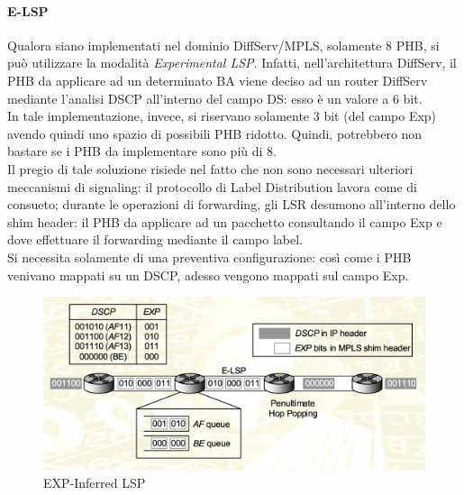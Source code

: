 \documentclass{article}
\begin{document}
\paragraph{E-LSP} Qualora siano implementati nel dominio DiffServ/MPLS, solamente 8 PHB, si può utilizzare la modalità \textit{Experimental LSP}. Infatti, nell'architettura DiffServ, il PHB da applicare ad un determinato BA viene deciso ad un router DiffServ mediante l'analisi DSCP all'interno del campo DS: esso è un valore a 6 bit. \\ In tale implementazione, invece, si riservano solamente 3 bit (del campo Exp) avendo quindi uno spazio di possibili PHB ridotto. Quindi, potrebbero non bastare se i PHB da implementare sono più di 8. \\ Il pregio di tale soluzione risiede nel fatto che non sono necessari ulteriori meccanismi di signaling: il protocollo di Label Distribution lavora come di consueto; durante le operazioni di forwarding, gli LSR desumono all'interno dello shim header: il PHB da applicare ad un pacchetto consultando il campo Exp e dove effettuare il forwarding mediante il campo label. \\ Si necessita solamente di una preventiva configurazione: così come i PHB venivano mappati su un DSCP, adesso vengono mappati sul campo Exp.
\begin{figure}[H]
    \centering
    \includegraphics[scale=0.4]{figures/exp lsp.png}
    \caption{EXP-Inferred LSP}
\end{figure}
\end{document}
